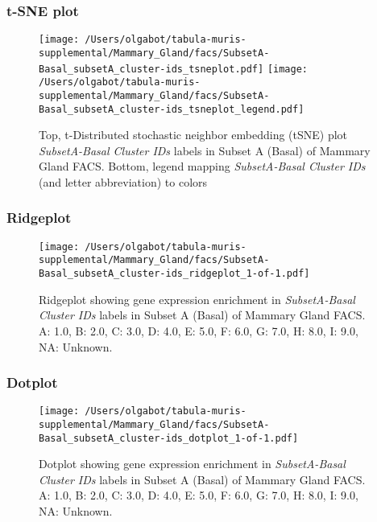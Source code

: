 \clearpage
\subsubsection{t-SNE plot}
\begin{figure}[h]
\centering
\texttt{[image: /Users/olgabot/tabula-muris-supplemental/Mammary\_Gland/facs/SubsetA-Basal\_subsetA\_cluster-ids\_tsneplot.pdf]}
\texttt{[image: /Users/olgabot/tabula-muris-supplemental/Mammary\_Gland/facs/SubsetA-Basal\_subsetA\_cluster-ids\_tsneplot\_legend.pdf]}
\caption{Top, t-Distributed stochastic neighbor embedding (tSNE) plot  \emph{SubsetA-Basal Cluster IDs} labels in Subset A (Basal) of Mammary Gland FACS. Bottom, legend mapping \emph{SubsetA-Basal Cluster IDs} (and letter abbreviation) to colors}
\end{figure}


\clearpage

\subsubsection{Ridgeplot}
\begin{figure}[h]
\centering
\texttt{[image: /Users/olgabot/tabula-muris-supplemental/Mammary\_Gland/facs/SubsetA-Basal\_subsetA\_cluster-ids\_ridgeplot\_1-of-1.pdf]}

\caption{ Ridgeplot  showing gene expression enrichment in \emph{SubsetA-Basal Cluster IDs} labels in Subset A (Basal) of Mammary Gland FACS. A: 1.0, B: 2.0, C: 3.0, D: 4.0, E: 5.0, F: 6.0, G: 7.0, H: 8.0, I: 9.0, NA: Unknown.}
\end{figure}


\clearpage

\subsubsection{Dotplot}
\begin{figure}[h]
\centering
\texttt{[image: /Users/olgabot/tabula-muris-supplemental/Mammary\_Gland/facs/SubsetA-Basal\_subsetA\_cluster-ids\_dotplot\_1-of-1.pdf]}

\caption{ Dotplot  showing gene expression enrichment in \emph{SubsetA-Basal Cluster IDs} labels in Subset A (Basal) of Mammary Gland FACS. A: 1.0, B: 2.0, C: 3.0, D: 4.0, E: 5.0, F: 6.0, G: 7.0, H: 8.0, I: 9.0, NA: Unknown.}
\end{figure}

